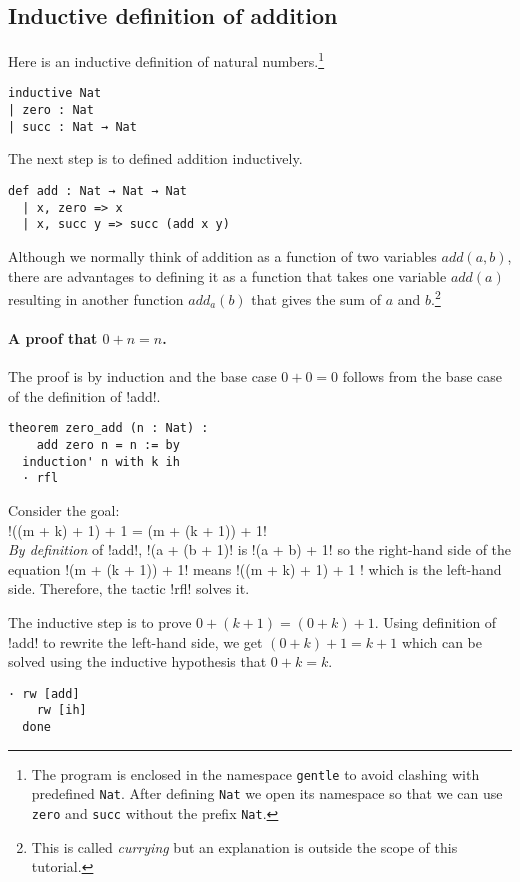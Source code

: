 \subsection{Inductive definition of addition}

Here is an inductive definition of natural numbers.\footnote{The program is enclosed in the namespace \Verb+gentle+ to avoid clashing with predefined \Verb+Nat+. After defining \Verb+Nat+ we open its namespace so that we can use \Verb+zero+ and \Verb+succ+ without the prefix \Verb+Nat+.}
\begin{Verbatim}
inductive Nat
| zero : Nat
| succ : Nat → Nat
\end{Verbatim}

The next step is to defined addition inductively.
\begin{Verbatim}[firstnumber=last]
def add : Nat → Nat → Nat
  | x, zero => x
  | x, succ y => succ (add x y)
\end{Verbatim}
Although we normally think of addition as a function of two variables $\textit{add}(a,b)$, there are advantages to defining it as a function that takes one variable $\textit{add}(a)$ resulting in another function $\textit{add}_{a}(b)$ that gives the sum of $a$ and $b$.\footnote{This is called \emph{currying} but an explanation is outside the scope of this tutorial.}

\paragraph{A proof that $0+n=n$.}
The proof is by induction and the base case $0+0=0$ follows from the base case of the definition of !add!.
\begin{Verbatim}[firstnumber=last]
theorem zero_add (n : Nat) :
    add zero n = n := by
  induction' n with k ih
  · rfl
\end{Verbatim}


Consider the goal:\\
\indnt{}!((m + k) + 1) + 1 = (m + (k + 1)) + 1!\\
\emph{By definition} of !add!, !(a + (b + 1)! is !(a + b) + 1! so the right-hand side of the equation !(m + (k + 1)) + 1! means !((m + k) + 1) + 1 ! which is the left-hand side. Therefore, the tactic !rfl! solves it.

The inductive step is to prove $0+(k+1)=(0+k)+1$. Using definition of !add! to rewrite the left-hand side, we get $(0+k)+1=k+1$ which can be solved using the inductive hypothesis that $0+k=k$.
\begin{Verbatim}[firstnumber=last]
  · rw [add]
    rw [ih]
  done
\end{Verbatim}


